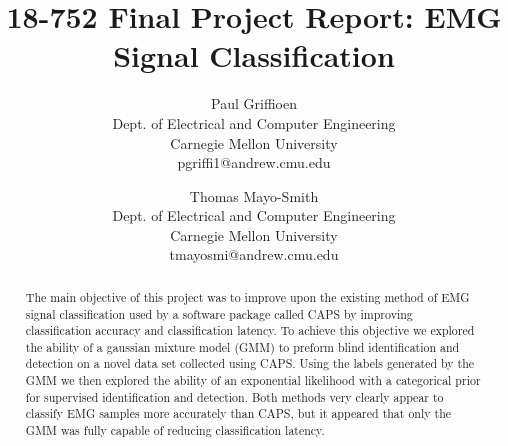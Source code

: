\documentclass[times, 10pt,twocolumn]{article}
\begin{document}
\title{18-752 Final Project Report: EMG Signal Classification}

\author{Paul Griffioen\\Dept. of Electrical and Computer Engineering\\Carnegie Mellon University\\ pgriffi1@andrew.cmu.edu\\
\and
Thomas Mayo-Smith\\Dept. of Electrical and Computer Engineering\\Carnegie Mellon University\\tmayosmi@andrew.cmu.edu\\
}

\maketitle
\thispagestyle{empty}

\begin{abstract}
The main objective of this project was to improve upon the existing method of EMG signal classification 
used by a software package called CAPS by improving classification accuracy and classification latency.
To achieve this objective we explored the ability of a gaussian mixture model (GMM) to preform blind identification 
and detection on a novel data set collected using CAPS. Using the labels generated by the GMM we then explored the
ability of an exponential likelihood with a categorical prior for supervised identification and detection.
Both methods very clearly appear to classify EMG samples more accurately than CAPS, but it appeared
that only the GMM was fully capable of reducing classification latency.
\end{abstract}

\end{document}
